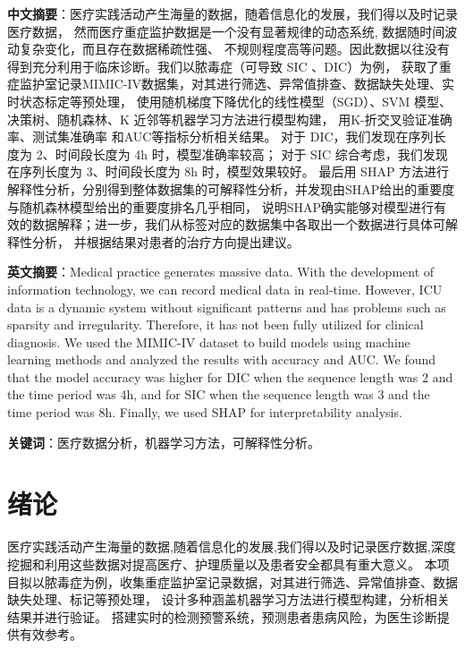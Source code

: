 \documentclass[12pt, a4paper, oneside]{ctexart}
\numberwithin{equation}{section}  %
\newcounter{problem}  %
\begin{document}
\textbf{中文摘要}：医疗实践活动产生海量的数据，随着信息化的发展，我们得以及时记录医疗数据，
然而医疗重症监护数据是一个没有显著规律的动态系统, 数据随时间波动复杂变化，而且存在数据稀疏性强、
不规则程度高等问题。因此数据以往没有得到充分利用于临床诊断。我们以脓毒症（可导致 SIC 、DIC）为例，
获取了重症监护室记录MIMIC-IV数据集，对其进行筛选、异常值排查、数据缺失处理、实时状态标定等预处理，
使用随机梯度下降优化的线性模型（SGD）、SVM 模型、决策树、随机森林、K 近邻等机器学习方法进行模型构建，
用K-折交叉验证准确率、测试集准确率 和AUC等指标分析相关结果。
对于 DIC，我们发现在序列长度为 2、时间段长度为 4h 时，模型准确率较高；
对于 SIC 综合考虑，我们发现在序列长度为 3、时间段长度为 8h 时，模型效果较好。
最后用 SHAP 方法进行解释性分析，分别得到整体数据集的可解释性分析，并发现由SHAP给出的重要度与随机森林模型给出的重要度排名几乎相同，
说明SHAP确实能够对模型进行有效的数据解释；进一步，我们从标签对应的数据集中各取出一个数据进行具体可解释性分析，
并根据结果对患者的治疗方向提出建议。

\textbf{英文摘要}：Medical practice generates massive data. With the development of information technology, 
we can record medical data in real-time. However, ICU data is a dynamic system without significant 
patterns and has problems such as sparsity and irregularity. Therefore, it has not been fully 
utilized for clinical diagnosis. We used the MIMIC-IV dataset to build models using machine learning 
methods and analyzed the results with accuracy and AUC. We found that the model accuracy was higher 
for DIC when the sequence length was 2 and the time period was 4h, and for SIC when the sequence 
length was 3 and the time period was 8h. Finally, we used SHAP for interpretability analysis.

\textbf{关键词}：医疗数据分析，机器学习方法，可解释性分析。
\clearpage
{}
\thispagestyle{tablestyle}
\tableofcontents %

\clearpage
\setcounter{page}{1}
\section{绪论}
医疗实践活动产生海量的数据,随着信息化的发展,我们得以及时记录医疗数据,深度挖掘和利用这些数据对提高医疗、护理质量以及患者安全都具有重大意义。
本项目拟以脓毒症为例，收集重症监护室记录数据，对其进行筛选、异常值排查、数据缺失处理、标记等预处理，
设计多种涵盖机器学习方法进行模型构建，分析相关结果并进行验证。
搭建实时的检测预警系统，预测患者患病风险，为医生诊断提供有效参考。
\end{document}

